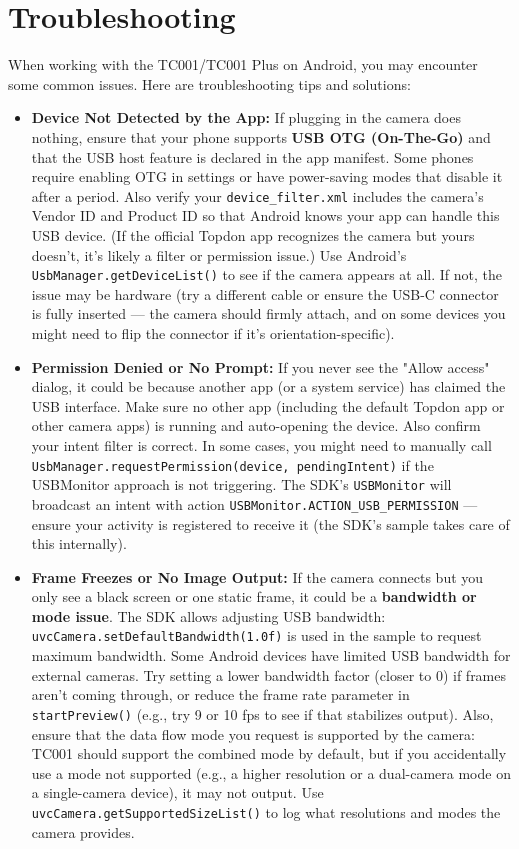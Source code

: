 {\section{Troubleshooting}

When working with the TC001/TC001 Plus on Android, you may encounter
some common issues. Here are troubleshooting tips and solutions:

\begin{itemize}
\item \textbf{Device Not Detected by the App:} If plugging in the camera does
  nothing, ensure that your phone supports \textbf{USB OTG (On-The-Go)} and
  that the USB host feature is declared in the app manifest. Some phones
  require enabling OTG in settings or have power-saving modes that
  disable it after a period. Also verify your \texttt{device_filter.xml}
  includes the camera's Vendor ID and Product ID so that Android knows
  your app can handle this USB device. (If the official Topdon app
  recognizes the camera but yours doesn't, it's likely a filter or
  permission issue.) Use Android's \texttt{UsbManager.getDeviceList()} to see
  if the camera appears at all. If not, the issue may be hardware (try a
  different cable or ensure the USB-C connector is fully inserted --- the
  camera should firmly attach, and on some devices you might need to
  flip the connector if it's orientation-specific).

\item \textbf{Permission Denied or No Prompt:} If you never see the "Allow
  access" dialog, it could be because another app (or a system service)
  has claimed the USB interface. Make sure no other app (including the
  default Topdon app or other camera apps) is running and auto-opening
  the device. Also confirm your intent filter is correct. In some cases,
  you might need to manually call
  \texttt{UsbManager.requestPermission(device, pendingIntent)} if the
  USBMonitor approach is not triggering. The SDK's \texttt{USBMonitor} will
  broadcast an intent with action \texttt{USBMonitor.ACTION_USB_PERMISSION} ---
  ensure your activity is registered to receive it (the SDK's sample
  takes care of this internally).

\item \textbf{Frame Freezes or No Image Output:} If the camera connects but you
  only see a black screen or one static frame, it could be a \textbf{bandwidth
  or mode issue}. The SDK allows adjusting USB bandwidth:
  \texttt{uvcCamera.setDefaultBandwidth(1.0f)} is used in the sample to request
  maximum
  bandwidth\cite{DeviceServer}.
  Some Android devices have limited USB bandwidth for external cameras.
  Try setting a lower bandwidth factor (closer to 0) if frames aren't
  coming through, or reduce the frame rate parameter in \texttt{startPreview()}
  (e.g., try 9 or 10 fps to see if that stabilizes output). Also, ensure
  that the data flow mode you request is supported by the camera: TC001
  should support the combined mode by default, but if you accidentally
  use a mode not supported (e.g., a higher resolution or a dual-camera
  mode on a single-camera device), it may not output. Use
  \texttt{uvcCamera.getSupportedSizeList()} to log what resolutions and modes
  the camera
  provides\cite{DeviceServer}.


\end{itemize}}
